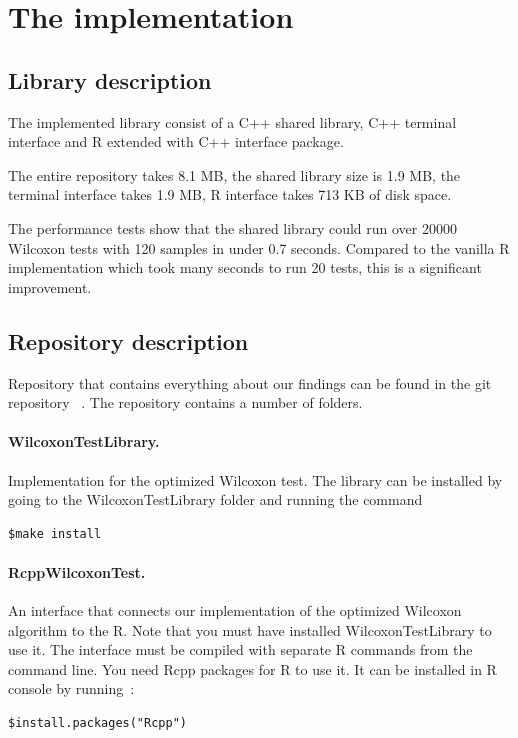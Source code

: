 \documentclass[12pt]{article}
\begin{document}
{\newpage

\section{The implementation}

\subsection{Library description}
The implemented library consist of a C++ shared library, C++ terminal interface and R extended with C++ interface package.

The entire repository takes 8.1 MB, the shared library size is 1.9 MB, the terminal interface takes 1.9 MB, R interface takes 713 KB of disk space.

The performance tests show that the shared library could run over 20000 Wilcoxon tests with 120 samples in under 0.7 seconds. Compared to the vanilla R implementation which took many seconds to run 20 tests, this is a significant improvement.

\subsection{Repository description}

Repository that contains everything about our findings can be found in the git repository ~\cite{wilx_repo}. The repository contains a number of folders.

\paragraph{WilcoxonTestLibrary.}
Implementation for the optimized Wilcoxon test. The library can be installed by going to the WilcoxonTestLibrary folder and running the command

\begin{lstlisting}
$make install
\end{lstlisting}

\paragraph{RcppWilcoxonTest.}
An interface that connects our implementation of the optimized Wilcoxon algorithm to the R. Note that you must have installed WilcoxonTestLibrary to use it. The interface must be compiled with separate R commands from the command line. You need Rcpp packages for R to use it. It can be installed in R console by running~\cite{r_cron}:
\begin{lstlisting}
$install.packages("Rcpp")
\end{lstlisting}

}
\end{document}
